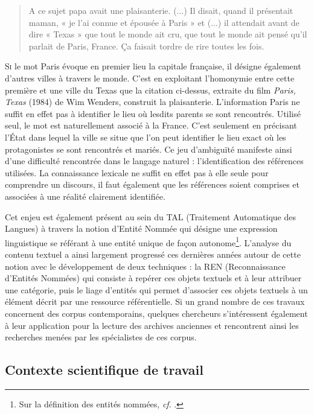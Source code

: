 \documentclass[a4paper,12pt,twoside]{book}
\begin{document}
	\begin{quotation}
		
	A ce sujet papa avait une plaisanterie. (...) Il disait, quand il présentait maman, « je l’ai connue et épousée à Paris » et (...) il attendait avant de dire « Texas » que tout le monde ait cru, que tout le monde ait pensé qu’il parlait de Paris, France. Ça faisait tordre de rire toutes les fois.
	
	\end{quotation}
	\bigbreak
	
	
	\lettrine{S}{i} le mot \og Paris\fg{} évoque en premier lieu la capitale française, il désigne également d'autres villes à travers le monde. C'est en exploitant l'homonymie entre cette première et une ville du Texas que la citation ci-dessus, extraite du film \textit{Paris, Texas} (1984) de Wim Wenders, construit la plaisanterie. L'information \og Paris\fg{} ne suffit en effet pas à identifier le lieu où lesdits parents se sont rencontrés. Utilisé seul, le mot est naturellement associé à la France. C'est seulement en précisant l'État dans lequel la ville se situe que l'on peut identifier le lieu exact où les protagonistes se sont rencontrés et mariés. Ce jeu d'ambiguïté manifeste ainsi d'une difficulté rencontrée dans le langage naturel : l'identification des références utilisées. La connaissance lexicale ne suffit en effet pas à elle seule pour comprendre un discours, il faut également que les références soient comprises et associées à une réalité clairement identifiée.
	
	Cet enjeu est également présent au sein du TAL (Traitement Automatique des Langues) à travers la notion d'Entité Nommée qui désigne une expression linguistique se référant à une entité unique de façon autonome\footnote{Sur la définition des entités nommées, \textit{cf}. \cite[p. 167--170]{ehrmann_les_2008}.}. L'analyse du contenu textuel a ainsi largement progressé ces dernières années autour de cette notion avec le développement de deux techniques : la REN (Reconnaissance d'Entités Nommées) qui consiste à repérer ces objets textuels et à leur attribuer une catégorie, puis le liage d'entités qui permet d'associer ces objets textuels à un élément décrit par une ressource référentielle. Si un grand nombre de ces travaux concernent des corpus contemporains, quelques chercheurs s'intéressent également à leur application pour la lecture des archives anciennes et rencontrent ainsi les recherches menées par les spécialistes de ces corpus.
	
	\subsection*{Contexte scientifique de travail}
	
\end{document}
